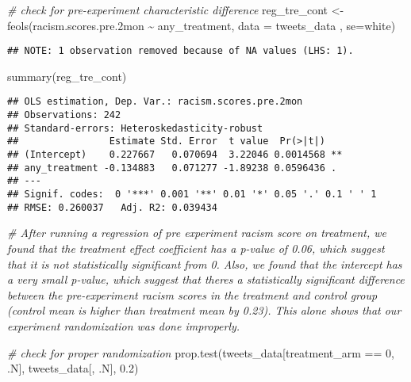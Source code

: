 \documentclass[
]{article}
\newenvironment{Shaded}{\begin{snugshade}}{\end{snugshade}}
\newcommand{\AttributeTok}[1]{\textcolor[rgb]{0.77,0.63,0.00}{#1}}
\newcommand{\CommentTok}[1]{\textcolor[rgb]{0.56,0.35,0.01}{\textit{#1}}}
\newcommand{\DecValTok}[1]{\textcolor[rgb]{0.00,0.00,0.81}{#1}}
\newcommand{\FloatTok}[1]{\textcolor[rgb]{0.00,0.00,0.81}{#1}}
\newcommand{\FunctionTok}[1]{\textcolor[rgb]{0.00,0.00,0.00}{#1}}
\newcommand{\NormalTok}[1]{#1}
\newcommand{\OtherTok}[1]{\textcolor[rgb]{0.56,0.35,0.01}{#1}}
\newcommand{\SpecialCharTok}[1]{\textcolor[rgb]{0.00,0.00,0.00}{#1}}
\newcommand{\StringTok}[1]{\textcolor[rgb]{0.31,0.60,0.02}{#1}}
\begin{document}
\begin{Shaded}
\begin{Highlighting}[]
\CommentTok{\# check for pre{-}experiment characteristic difference }
\NormalTok{reg\_tre\_cont }\OtherTok{\textless{}{-}} \FunctionTok{feols}\NormalTok{(racism.scores.pre}\FloatTok{.2}\NormalTok{mon }\SpecialCharTok{\textasciitilde{}}\NormalTok{ any\_treatment, }\AttributeTok{data =}\NormalTok{ tweets\_data , }\AttributeTok{se=}\StringTok{\textquotesingle{}white\textquotesingle{}}\NormalTok{)}
\end{Highlighting}
\end{Shaded}

\begin{verbatim}
## NOTE: 1 observation removed because of NA values (LHS: 1).
\end{verbatim}

\begin{Shaded}
\begin{Highlighting}[]
\FunctionTok{summary}\NormalTok{(reg\_tre\_cont)}
\end{Highlighting}
\end{Shaded}

\begin{verbatim}
## OLS estimation, Dep. Var.: racism.scores.pre.2mon
## Observations: 242 
## Standard-errors: Heteroskedasticity-robust 
##                Estimate Std. Error  t value  Pr(>|t|)    
## (Intercept)    0.227667   0.070694  3.22046 0.0014568 ** 
## any_treatment -0.134883   0.071277 -1.89238 0.0596436 .  
## ---
## Signif. codes:  0 '***' 0.001 '**' 0.01 '*' 0.05 '.' 0.1 ' ' 1
## RMSE: 0.260037   Adj. R2: 0.039434
\end{verbatim}

\begin{Shaded}
\begin{Highlighting}[]
\CommentTok{\# After running a regression of pre experiment racism score on treatment, we found that the treatment effect coefficient has a p{-}value of 0.06, which suggest that it is not statistically significant from 0. Also, we found that the intercept has a very small p{-}value, which suggest that there\textquotesingle{}s a statistically significant difference between the pre{-}experiment racism scores in the treatment and control group (control mean is higher than treatment mean by 0.23). This alone shows that our experiment randomization was done improperly. }

\CommentTok{\# check for proper randomization}
\FunctionTok{prop.test}\NormalTok{(tweets\_data[treatment\_arm }\SpecialCharTok{==} \DecValTok{0}\NormalTok{, .N], tweets\_data[, .N], }\FloatTok{0.2}\NormalTok{)}
\end{Highlighting}
\end{Shaded}
\end{document}
